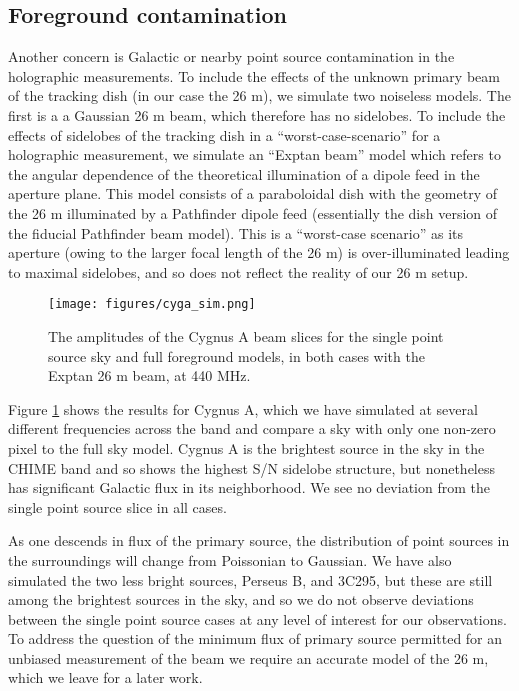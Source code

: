 \subsection{Foreground contamination}
Another concern is Galactic or nearby point source contamination in the holographic measurements. To include the effects of the unknown primary beam of the tracking dish (in our case the 26 m), we simulate two noiseless models. The first is a a Gaussian 26 m beam, which therefore has no sidelobes. To include the effects of sidelobes of the tracking dish in a ``worst-case-scenario'' for a holographic measurement, we simulate an ``Exptan beam'' model which refers to the angular dependence of the theoretical illumination of a dipole feed in the aperture plane\citep{mmodes2}. This model consists of a paraboloidal dish with the geometry of the 26 m illuminated by a Pathfinder dipole feed (essentially the dish version of the fiducial Pathfinder beam model). This is a ``worst-case scenario'' as its aperture (owing to the larger focal length of the 26 m) is over-illuminated leading to maximal sidelobes, and so does not reflect the reality of our 26 m setup.

\begin{figure}[ht] %
	\centering	
	\texttt{[image: figures/cyga\_sim.png]}%
	\caption{The amplitudes of the Cygnus A beam slices for the single point source sky and full foreground models, in both cases with the Exptan 26 m beam, at 440 MHz. }
	\label{cygasim}
\end{figure}


Figure \ref{cygasim} shows the results for Cygnus A, which we have simulated at several different frequencies across the band and compare a sky with only one non-zero pixel to the full sky model. Cygnus A is the brightest source in the sky in the CHIME band and so shows the highest S/N sidelobe structure, but nonetheless has significant Galactic flux in its neighborhood. We see no deviation from the single point source slice in all cases.

As one descends in flux of the primary source, the distribution of point sources in the surroundings will change from Poissonian to Gaussian. We have also simulated the two less bright sources, Perseus B, and 3C295, but these are still among the brightest sources in the sky, and so we do not observe deviations between the single point source cases at any level of interest for our observations. To address the question of the minimum flux of primary source permitted for an unbiased measurement of the beam we require an accurate model of the 26 m, which we leave for a later work.

